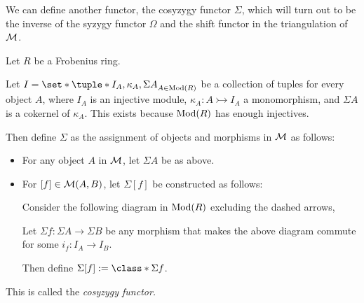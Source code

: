 We can define another functor, the cosyzygy functor \( \Sigma \), which will turn out to be the inverse of the syzygy functor \( \Omega \) and the shift functor in the triangulation of \( {\mathcal{M}} \).

\begin{definition}
    \label{def:stmod_sigma}
    Let \( R \) be a Frobenius ring.

    Let \( I = \set*{\tuple*{I_A, \kappa_A, \Sigma A}}_{A \in \Mod(R)} \) be a collection of tuples for every object \( A \), where \( I_A \) is an injective module, \( \kappa_A: A \rightarrowtail I_A \) a monomorphism, and \( \Sigma A \) is a cokernel of \( \kappa_A \). This exists because \( \operatorname{Mod}(R) \) has enough injectives.

    Then define \( \Sigma \) as the assignment of objects and morphisms in \( {\mathcal{M}} \) as follows:
    \begin{itemize}
        \item {
            For any object \( A \) in \( {\mathcal{M}} \), let \( \Sigma A \) be as above.
        }
        \item {
            For \( [f] \in {\mathcal{M}}(A, B) \), let \( \Sigma [f] \) be constructed as follows:

            Consider the following diagram in \( \operatorname{Mod}(R) \) excluding the dashed arrows,
            \begin{center}
            \end{center}

            Let \( \Sigma f: \Sigma A \to \Sigma B \) be any morphism that makes the above diagram commute for some \( i_f: I_A \to I_B \).

            Then define \( \Sigma [f] := \class*{\Sigma f} \).
        }
    \end{itemize}
    This is called the \emph{cosyzygy functor.}
\end{definition}


